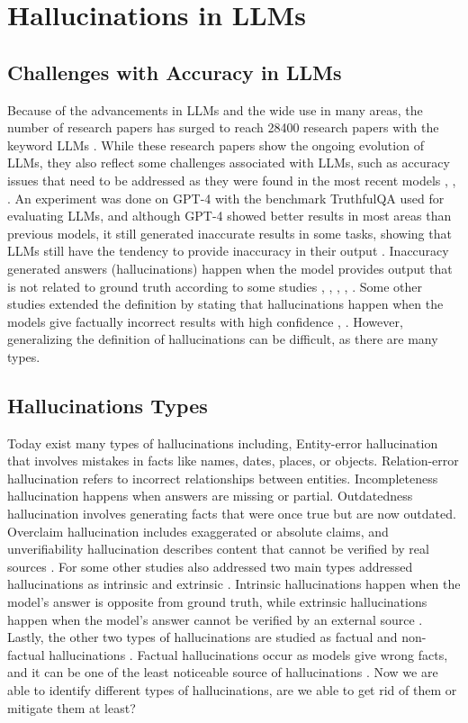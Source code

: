 \documentclass[twocolumn]{article}
\begin{document}
\section{Hallucinations in LLMs}
\subsection{Challenges with Accuracy in LLMs}
Because of the advancements in LLMs and the wide use in many areas, the number of research papers has surged to reach 28400 research papers with the keyword LLMs \cite{minaee2024large}. While these research papers show the ongoing evolution of LLMs, they also reflect some challenges associated with LLMs, such as accuracy issues that need to be addressed as they were found in the most recent models \cite{minaee2024large}, \cite{wang2023overview}, \cite{brown2023gpt4}.
An experiment was done on GPT-4 with the benchmark TruthfulQA used for evaluating LLMs, and although GPT-4 showed better results in most areas than previous models, it still generated inaccurate results in some tasks, showing that LLMs still have the tendency to provide inaccuracy in their output \cite{wang2023overview}. Inaccuracy generated answers (hallucinations) happen when the model provides output that is not related to ground truth according to some studies \cite{liu2025attention}, \cite{manakul2023selfcheckgpt}, \cite{varshney2023selfcritiquing}, \cite{xu2024hallucination}, \cite{fu2024hallucination}. Some other studies extended the definition by stating that hallucinations happen when the models give factually incorrect results with high confidence \cite{manakul2023selfcheckgpt}, \cite{varshney2023selfcritiquing}. However, generalizing the definition of hallucinations can be difficult, as there are many types. 
\subsection{Hallucinations Types}
Today exist many types of hallucinations including, Entity-error hallucination that involves mistakes in facts like names, dates, places, or objects. Relation-error hallucination refers to incorrect relationships between entities. Incompleteness hallucination happens when answers are missing or partial. Outdatedness hallucination involves generating facts that were once true but are now outdated. Overclaim hallucination includes exaggerated or absolute claims, and unverifiability hallucination describes content that cannot be verified by real sources \cite{li2024dawn}. For some other studies also addressed two main types addressed hallucinations as intrinsic and extrinsic \cite{varshney2023validating}. Intrinsic hallucinations happen when the model’s answer is opposite from ground truth, while extrinsic hallucinations happen when the model’s answer cannot be verified by an external source \cite{varshney2023validating}. Lastly, the other two types of hallucinations are studied as factual and non-factual hallucinations \cite{li2024dawn}.  Factual hallucinations occur as models give wrong facts, and it can be one of the least noticeable source of hallucinations \cite{xu2024hallucination}. Now we are able to identify different types of hallucinations, are we able to get rid of them or mitigate them at least?
\end{document}
